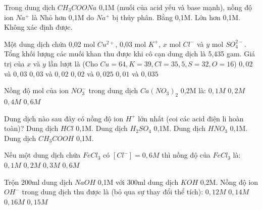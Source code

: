 \begin{ex}
    Trong dung dịch $CH_3COONa$ 0,1M (muối của acid yếu và base mạnh), nồng độ ion $Na^+$ là
	\choice
	{Nhỏ hơn 0,1M do $Na^+$ bị thủy phân.}
	{\True Bằng 0,1M.}
	{Lớn hơn 0,1M.}
	{Không xác định được.}
\end{ex}
\begin{ex}
    Một dung dịch chứa 0,02 mol $Cu^{2+}$, 0,03 mol $K^+$, $x$ mol $Cl^-$ và $y$ mol $SO_4^{2-}$. Tổng khối lượng các muối khan thu được khi cô cạn dung dịch là 5,435 gam. Giá trị của $x$ và $y$ lần lượt là (Cho $Cu=64, K=39, Cl=35,5, S=32, O=16$)
	\choice
	{$0,02$ và $0,03$}
	{$0,03$ và $0,02$}
	{\True $0,02$ và $0,025$} %
	{$0,01$ và $0,035$}
	\loigiai{}
\end{ex}
\begin{ex}
    Nồng độ mol của ion $NO_3^-$ trong dung dịch $Ca(NO_3)_2$ 0,2M là:
    \choice
    {$0,1M$}
    {$0,2M$}
    {\True $0,4M$}
    {$0,6M$}
\end{ex}
\begin{ex}
    Dung dịch nào sau đây có nồng độ ion $H^+$ lớn nhất (coi các acid điện li hoàn toàn)?
    \choice
    {Dung dịch $HCl$ 0,1M.}
    {\True Dung dịch $H_2SO_4$ 0,1M.}
    {Dung dịch $HNO_3$ 0,1M.}
    {Dung dịch $CH_3COOH$ 0,1M.}
\end{ex}
\begin{ex}
    Nếu một dung dịch chứa $FeCl_3$ có $[Cl^-] = 0,6M$ thì nồng độ của $FeCl_3$ là:
    \choice
    {$0,1M$}
    {\True $0,2M$}
    {$0,3M$}
    {$0,6M$}
\end{ex}
\begin{ex}
    Trộn 200ml dung dịch $NaOH$ 0,1M với 300ml dung dịch $KOH$ 0,2M. Nồng độ ion $OH^-$ trong dung dịch thu được là (bỏ qua sự thay đổi thể tích):
    \choice
    {$0,12M$}
    {$0,14M$}
    {\True $0,16M$}
    {$0,15M$}
\end{ex}
